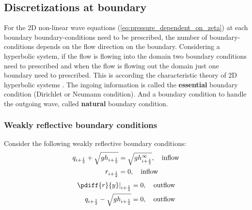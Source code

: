 \subsection{Discretizations at boundary}
For the 2D non-linear wave equations (\autoref{eq:pressure_dependent_on_zeta}) at each boundary boundary-conditions need to be prescribed, the number of boundary-conditions depends on the flow direction on the boundary.
Considering a hyperbolic system, if the flow is flowing into the domain two boundary conditions need to prescribed and when the flow is flowing out the domain just one boundary need to prescribed.
This is according the characteristic theory of 2D hyperbolic systems \citep{DaubertEtGraffe1967}.
The ingoing information is called the \textbf{essential} boundary condition (Dirichlet or Neumann condition).
And a boundary condition to handle the outgoing wave, called \textbf{natural} boundary condition.

\subsubsection{Weakly reflective boundary conditions}
Consider the following weakly reflective boundary conditions:
\begin{align}
    q_{i+\frac{1}{2}} + \sqrt{gh_{i+\frac{1}{2}}} &= \sqrt{gh^\infty_{i+\frac{1}{2}}}, \quad \text{inflow}
    \\
    r_{i+\frac{1}{2}} &= 0, \quad \text{inflow}
\end{align}
\begin{align}
    \left.\pdiff{r}{y}\right|_{i+\half} &= 0, \quad \text{outflow}
    \\
    q_{i+\half} - \sqrt{gh_{i+\half}} & = 0, \quad \text{outflow}
\end{align}